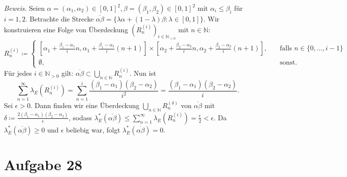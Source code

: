 \documentclass[a4paper,DIV=1]{article}
\theoremstyle{plain}
\newtheorem{lemma}{Lemma}
\begin{document}
\begin{enumerate}[label=(\roman*)]
	\textit{Beweis.} Seien $\alpha = (\alpha_1, \alpha_2) \in [0,1]^2, \beta = (\beta_1, \beta_2) \in [0,1]^2$  mit $\alpha_i \leq \beta_i$ für $i=1,2$. Betrachte die Strecke $\overline{\alpha\beta} = \{ \lambda\alpha + (1-\lambda) \beta : \lambda \in [0,1] \}$. Wir konstruieren eine Folge von Überdeckung $(R_n^{(i)})_{i \in \mathbb N_{>0}}$ mit $n \in \mathbb N$:
	\[
		R_n^{(i)} \coloneqq 
		\begin{cases}
			[ \alpha_1 + \frac{\beta_1-\alpha_1}{i}n,  \alpha_1 + \frac{\beta_1-\alpha_1}{i}(n+1) ] \times [ \alpha_2 + \frac{\beta_2-\alpha_2}{i}n,  \alpha_2 + \frac{\beta_2-\alpha_2}{i}(n+1)], &\quad \text{falls } n \in \{0,...,i-1\} \\
			\emptyset, &\quad \text{sonst.}
		\end{cases}
	\]
	Für jedes $i \in \mathbb N_{>0}$ gilt: $\overline{\alpha\beta} \subset \bigcup\limits_{n \in \mathbb N}R_n^{(i)}$. Nun ist 
	\[
		\sum^{\infty}_{n=1} \lambda_E(R_n^{(i)}) = \sum^{i}_{n=1}\frac{(\beta_1-\alpha_1)(\beta_2-\alpha_2)}{i^2} = \frac{(\beta_1-\alpha_1)(\beta_2-\alpha_2)}{i}.
	\]
	Sei $\epsilon >0$. Dann finden wir eine Überdeckung $\bigcup\limits_{n \in \mathbb N}R_n^{(\delta)}$ von $\overline{\alpha\beta}$ mit $\delta \coloneqq \frac{2(\beta_1-\alpha_1)(\beta_2-\alpha_2)}{\epsilon}$, sodass $\lambda_E^*(\overline{\alpha\beta}) \leq \sum^{\infty}_{n=1}\lambda_E(R_n^{(i)}) = \frac{\epsilon}{2} < \epsilon$. Da $\lambda_E^*(\overline{\alpha\beta}) \geq 0$ und $\epsilon$ beliebig war, folgt $\lambda_E^*(\overline{\alpha\beta}) = 0$.
\end{enumerate}

\section*{Aufgabe 28}
\iffalse
\begin{lemma}
	Für jedes $R \in \mathcal R$ gilt, dass
	\begin{align}
		\forall x \in \mathbb R: \lambda(R) = \lambda(R+x).
	\end{align}
\end{lemma}
\begin{proof}
	Falls $\lambda^*(R) = \infty$, so ist auch $\lambda^*(R+x) = \infty$, da $\infty + x = \infty$ für alle $x \in \mathbb R$. Ansonsten sei $R = \{ (x,y) \in \mathbb R^2: a \leq x \leq b \land c \leq y \leq d \}$ mit $a,b,c,d \in \mathbb R$. Dann ist
	\[
		\forall x \in \mathbb R: \lambda(R) = (b-a)(d-c) = (b+x-(a+x))(d+x-(c+x)) = \lambda(R+x).
	\]
\end{proof}
\fi
\end{document}
